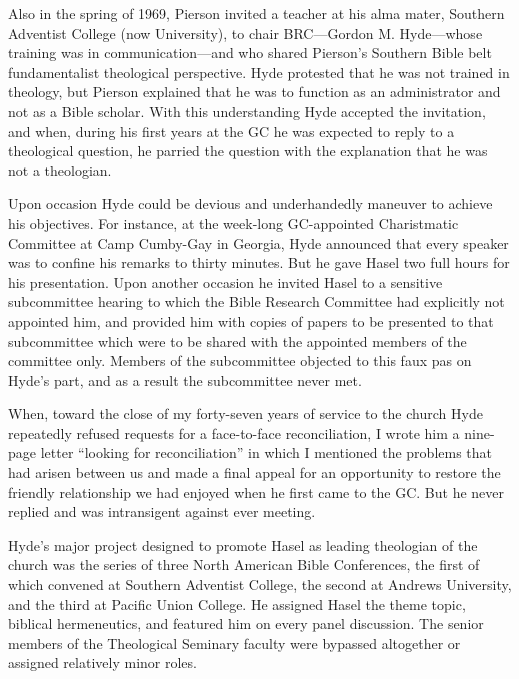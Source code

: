 Also in the spring of 1969, Pierson invited a teacher at his alma mater,
Southern Adventist College (now University), to chair BRC---Gordon M.
Hyde---whose training was in communication---and who shared Pierson's
Southern Bible belt fundamentalist theological perspective. Hyde protested
that he was not trained in theology, but Pierson explained that he was to
function as an administrator and not as a Bible scholar. With this
understanding Hyde accepted the invitation, and when, during his first years
at the GC he was expected to reply to a theological question, he parried the
question with the explanation that he was not a theologian.

Upon occasion Hyde could be devious and underhandedly maneuver to achieve
his objectives. For instance, at the week-long GC-appointed Charistmatic
Committee at Camp Cumby-Gay in Georgia, Hyde announced that every speaker
was to confine his remarks to thirty minutes. But he gave Hasel two full
hours for his presentation. Upon another occasion he invited Hasel to a
sensitive subcommittee hearing to which the Bible Research Committee had
explicitly not appointed him, and provided him with copies of papers to be
presented to that subcommittee which were to be shared with the appointed
members of the committee only. Members of the subcommittee objected to this
faux pas on Hyde's part, and as a result the subcommittee never met.\cite{145}

When, toward the close of my forty-seven years of service to the church Hyde
repeatedly refused requests for a face-to-face reconciliation, I wrote him a
nine-page letter ``looking for reconciliation'' in which I mentioned the
problems that had arisen between us and made a final appeal for an
opportunity to restore the friendly relationship we had enjoyed when he
first came to the GC. But he never replied and was intransigent against ever
meeting.

Hyde's major project designed to promote Hasel as leading theologian of the
church was the series of three North American Bible Conferences, the first
of which convened at Southern Adventist College, the second at Andrews
University, and the third at Pacific Union College. He assigned Hasel the 
theme topic, biblical hermeneutics, and featured him on every panel
discussion. The senior members of the Theological Seminary faculty were
bypassed altogether or assigned relatively minor 
roles.

